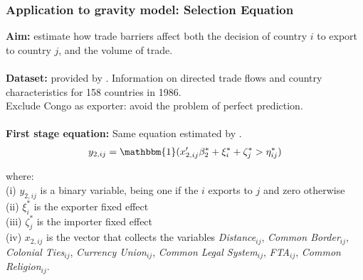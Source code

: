 \begin{frame}
    \frametitle{Application to gravity model: Selection Equation}
    \textbf{Aim:} estimate how trade barriers affect both the decision of country $i$ to export to country $j$, and the volume of trade. \pause
    \\~\\ 
    \textbf{Dataset:} provided by \cite{helpman2008estimating}. Information on directed trade flows and country characteristics for 158 countries in 1986. \\
    Exclude Congo as exporter: avoid the problem of perfect prediction. \pause
    \\~\\ 
    \textbf{First stage equation:} Same equation estimated by \cite{helpman2008estimating}.
    \begin{align*}
        y_{2,i j}= \mathbbm{1}(x_{2,ij}'\beta_2^* +\xi_{i}^*+\zeta_{j}^* >\eta_{i j}^*)
    \end{align*}
    
    \noindent where: \\
    (i) $y_{2,i j}$ is a binary variable, being one if the $i$ exports to $j$ and zero otherwise \\
    (ii) $\xi_{i}^*$ is the exporter fixed effect \\(iii) $\zeta_{j}^*$ is the importer fixed effect \\(iv) $x_{2,ij}$ is the vector that collects the variables \textit{Distance}$_{ij}$, \textit{Common Border}$_{ij}$, \textit{Colonial Ties}$_{ij}$, \textit{Currency Union}$_{ij}$, \textit{Common Legal System}$_{ij}$, \textit{FTA}$_{ij}$, \textit{Common Religion}$_{ij}$.
\end{frame}

